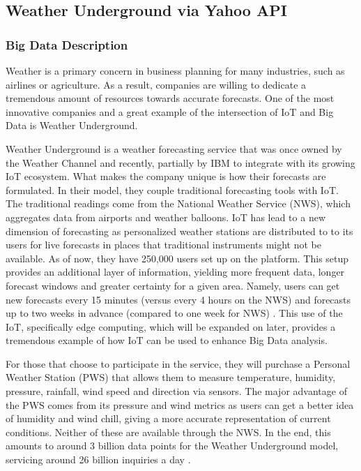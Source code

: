 \documentclass[sigconf]{acmart}
\begin{document}
\subsection{Weather Underground via Yahoo API}
\subsubsection{Big Data Description}
Weather is a primary concern in business planning for many industries, such as airlines or agriculture. As a result, companies are willing to dedicate a tremendous amount of resources towards accurate forecasts. One of the most innovative companies and a great example of the intersection of IoT and Big Data is Weather Underground. 

Weather Underground is a weather forecasting service that was once owned by the Weather Channel and recently, partially by IBM to integrate with its growing IoT ecosystem. What makes the company unique is how their forecasts are formulated. In their model,  they couple traditional forecasting tools with IoT. The traditional readings come from the National Weather Service (NWS), which aggregates data from airports and weather balloons. IoT has lead to a new dimension of forecasting as personalized weather stations are distributed to to its users for live forecasts in places that traditional instruments might not be available. As of now, they have 250,000 users set up on the platform. This setup provides an additional layer of information, yielding more frequent data, longer forecast windows and greater certainty for a given area. Namely, users can get new forecasts every 15 minutes (versus every 4 hours on the NWS) and forecasts up to two weeks in advance (compared to one week for NWS) \cite{wuabt}. This use of the IoT, specifically edge computing, which will be expanded on later, provides a tremendous example of how IoT can be used to enhance Big Data analysis. 

For those that choose to participate in the service, they will purchase a Personal Weather Station (PWS) that allows them to measure temperature, humidity, pressure, rainfall, wind speed and direction via sensors. The major advantage of the PWS comes from its pressure and wind metrics as users can get a better idea of humidity and wind chill, giving a more accurate representation of current conditions. Neither of these are available through the NWS. In the end, this amounts to around 3 billion data points for the Weather Underground model, servicing around 26 billion inquiries a day \cite{ibm}.
\end{document}
